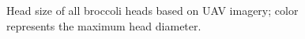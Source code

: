 \begin{figure}[htb]
  \begin{center}
  \end{center}
  \caption[Head size of all broccoli heads based on UAV imagery]{
    Head size of all broccoli heads based on UAV imagery; color represents the maximum head diameter.
  }
  \label{fig:bros2}
\end{figure}